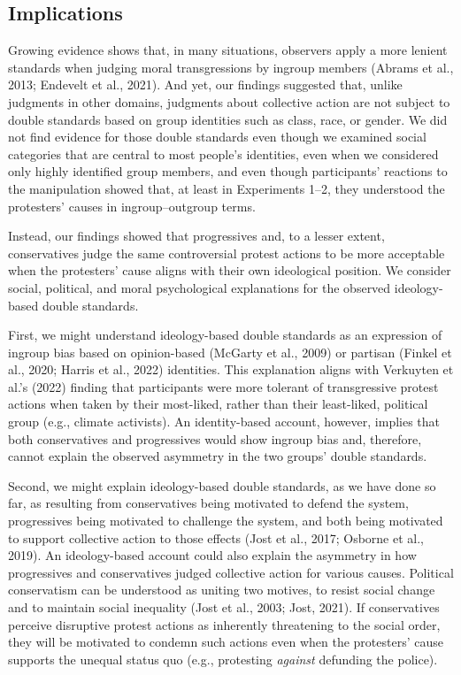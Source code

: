 \documentclass[12pt, letterpaper]{article}
\begin{document}
\hypertarget{implications}{%
\subsection{Implications}\label{implications}}

Growing evidence shows that, in many situations, observers apply a more
lenient standards when judging moral transgressions by ingroup members
(Abrams et al., 2013; Endevelt et al., 2021). And yet, our findings
suggested that, unlike judgments in other domains, judgments about
collective action are not subject to double standards based on group
identities such as class, race, or gender. We did not find evidence for
those double standards even though we examined social categories that
are central to most people's identities, even when we considered only
highly identified group members, and even though participants' reactions
to the manipulation showed that, at least in Experiments 1--2, they
understood the protesters' causes in ingroup--outgroup terms.

Instead, our findings showed that progressives and, to a lesser extent,
conservatives judge the same controversial protest actions to be more
acceptable when the protesters' cause aligns with their own ideological
position. We consider social, political, and moral psychological
explanations for the observed ideology-based double standards.

First, we might understand ideology-based double standards as an
expression of ingroup bias based on opinion-based (McGarty et al., 2009)
or partisan (Finkel et al., 2020; Harris et al., 2022) identities. This
explanation aligns with Verkuyten et al.'s (2022) finding that
participants were more tolerant of transgressive protest actions when
taken by their most-liked, rather than their least-liked, political
group (e.g., climate activists). An identity-based account, however,
implies that both conservatives and progressives would show ingroup bias
and, therefore, cannot explain the observed asymmetry in the two groups'
double standards.

Second, we might explain ideology-based double standards, as we have
done so far, as resulting from conservatives being motivated to defend
the system, progressives being motivated to challenge the system, and
both being motivated to support collective action to those effects (Jost
et al., 2017; Osborne et al., 2019). An ideology-based account could
also explain the asymmetry in how progressives and conservatives judged
collective action for various causes. Political conservatism can be
understood as uniting two motives, to resist social change and to
maintain social inequality (Jost et al., 2003; Jost, 2021). If
conservatives perceive disruptive protest actions as inherently
threatening to the social order, they will be motivated to condemn such
actions even when the protesters' cause supports the unequal status quo
(e.g., protesting \emph{against} defunding the police).
\end{document}
